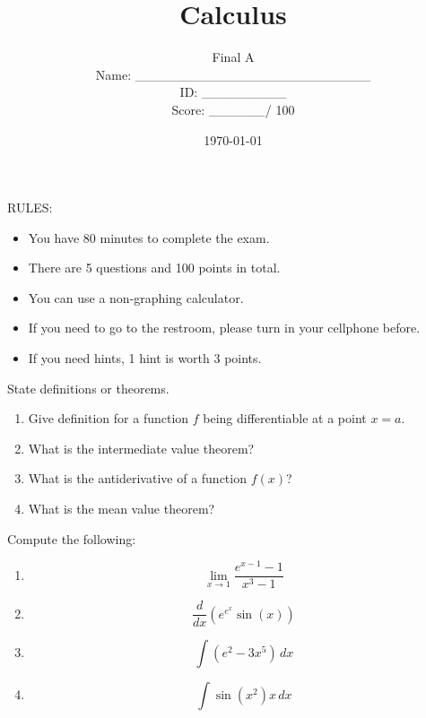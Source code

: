\documentclass[12pt]{amsart}
\title{ Calculus }
\author{  Final A \\ \vspace{1cm} Name: \_\_\_\_\_\_\_\_\_\_\_\_\_\_\_\_\_\_\_\_\_\_\_\_\_  
\\ \vspace{1cm} ID: \_\_\_\_\_\_\_\_\_ \\ \vspace{1cm} Score: \_\_\_\_\_\_/ 100}
\date{\today}
\begin{document}
\maketitle


RULES:
\begin{itemize}
	\item You have 80 minutes to complete the exam.
	\item There are 5 questions and 100 points in total.
	\item You can use a non-graphing calculator.
	\item If you need to go to the restroom, please turn in your cellphone before.
	\item If you need hints, 1 hint is worth 3 points.
\end{itemize}

\newpage

\begin{problem}[20 points]
State definitions or theorems.

\begin{enumerate}
	\item Give definition for a function $f$ being differentiable at a point $x=a$.
	      \vspace{9cm}
	\item What is the intermediate value theorem?
	      \vspace{9cm}

	      \newpage
	\item What is the antiderivative of a function $f(x)$?
	      \vspace{9cm}

	\item What is the mean value theorem?
	      \vspace{9cm}

\end{enumerate}
\end{problem}

\newpage

\begin{problem}[20 points]
Compute the following:

\begin{enumerate}
	\item $$ \lim_{x \to 1} \frac{ e^{x-1} - 1}{x^3 - 1} $$
	      \vspace{8cm}
	\item $$ \frac{d}{dx} \left( e^{e^x} \sin(x)  \right)$$
	      \vspace{8cm}
	\item $$ \int ( e^2 - 3x^5 ) \, dx $$
	      \vspace{8cm}

	\item $$\int  \sin(x^2) x \, dx $$
	      \vspace{8cm}

\end{enumerate}
\end{problem}
\end{document}
